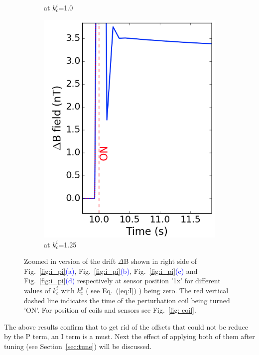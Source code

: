 \begin{figure}[!htb]
\begin{subfigure}{.5\linewidth}
        \caption{at $k_c^i$=1.0}
        \label{fig:i100zoom}
    \end{subfigure}%
        \begin{subfigure}{.5\linewidth}
        \centering
        \includegraphics[width=\linewidth, height= 6.5 cm]{Images/i125_33_zoom.png}
        \caption{at $k_c^i$=1.25}
        \label{fig:i125zoom}
    \end{subfigure}

    \caption{Zoomed in version of the drift $\Delta$B shown in right side of Fig.~\ref{fig:i_pi}\textcolor{blue}{(a)}, Fig.~\ref{fig:i_pi}\textcolor{blue}{(b)}, Fig.~\ref{fig:i_pi}\textcolor{blue}{(c)} and Fig.~\ref{fig:i_pi}\textcolor{blue}{(d)} respectively at sensor position '1x' for different values of $k_c^i$ with $k_c^p$ ( see Eq.~(\ref{eq:I}) ) being zero. The red vertical dashed line indicates the time of the perturbation coil being turned 'ON'. For position of coils and sensors see Fig.~\ref{fig: coil}.\label{fig:i_pi_zoom}}
\end{figure}



\FloatBarrier
The above results confirm that to get rid of the offsets that could not be reduce by the P term, an I term is a must. Next the effect of applying both of them after tuning (see Section~\ref{sec:tune}) will be discussed.
 

